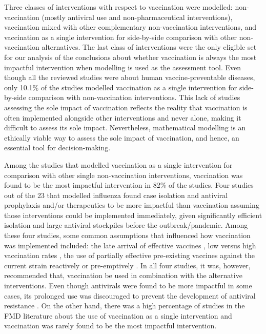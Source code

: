 \documentclass[10pt,letterpaper]{article}
\begin{document}
Three classes of interventions with respect to vaccination were modelled: non-vaccination (mostly antiviral use and non-pharmaceutical interventions), vaccination mixed with other complementary non-vaccination interventions, and vaccination as a single intervention for side-by-side comparison with other non-vaccination alternatives. The last class of interventions were the only eligible set for our analysis of the conclusions about whether vaccination is always the most impactful intervention when modelling is used as the assessment tool. Even though all the reviewed studies were about human vaccine-preventable diseases, only 10.1\% of the studies modelled vaccination as a single intervention for side-by-side comparison with non-vaccination interventions. This lack of studies assessing the sole impact of vaccination reflects the reality that vaccination is often  implemented alongside other interventions and never alone, making it difficult to assess its sole impact. Nevertheless, mathematical modelling is an ethically viable way to assess the sole impact of vaccination, and hence, an essential tool for decision-making.  

Among the studies that modelled vaccination as a single intervention for comparison with other single non-vaccination interventions, vaccination was found to be the most impactful intervention in 82\% of the studies. Four studies out of the 23 that modelled influenza found case isolation \cite{Yasuda2009,Gao2016,Chen2020a} and antiviral prophylaxis and/or therapeutics \cite{Gumel2008} to be more impactful than vaccination assuming those interventions could be implemented immediately, given significantly efficient isolation and large antiviral stockpiles before the outbreak/pandemic. Among these four studies, some common assumptions that influenced how vaccination was implemented included: the late arrival of effective vaccines \cite{Yasuda2009}, low versus high vaccination rates \cite{Gao2016}, the use of partially effective pre-existing vaccines against the current strain reactively \cite{Gumel2009} or pre-emptively \cite{Chen2018}. In all four studies, it was, however, recommended that, vaccination be used in combination with the alternative interventions. Even though antivirals were found to be more impactful in some cases, its prolonged use was discouraged to prevent the development of antiviral resistance \cite{Gumel2009}. On the other hand, there was a high percentage of studies in the FMD literature about the use of vaccination as a single intervention and vaccination was rarely found to be the most impactful intervention. 
\end{document}
